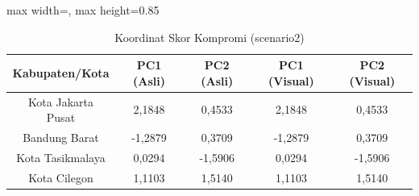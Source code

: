 \begin{table}[H]
\centering
\caption{Koordinat Skor Kompromi (scenario2)} \label{tab:sample2scores}
\begin{adjustbox}{max width=\textwidth, max height=0.85\textheight}
\begin{tabular}{|c|c|c|c|c|}
\hline
\textbf{Kabupaten/Kota} & \textbf{PC1 (Asli)} & \textbf{PC2 (Asli)} & \textbf{PC1 (Visual)} & \textbf{PC2 (Visual)} \\
\hline
Kota Jakarta Pusat & 2,1848 & 0,4533 & 2,1848 & 0,4533 \\
Bandung Barat & -1,2879 & 0,3709 & -1,2879 & 0,3709 \\
Kota Tasikmalaya & 0,0294 & -1,5906 & 0,0294 & -1,5906 \\
Kota Cilegon & 1,1103 & 1,5140 & 1,1103 & 1,5140 \\
\hline
\end{tabular}
\end{adjustbox}
\end{table}